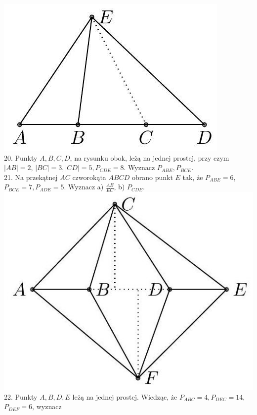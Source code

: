 \documentclass[10pt]{article}
\begin{document}
\includegraphics[max width=\textwidth, center]{2024_11_21_71f62bd117d375398909g-035}\\
20. Punkty \(A, B, C, D\), na rysunku obok, leżą na jednej prostej, przy czym \(|A B|=2\), \(|B C|=3,|C D|=5, P_{C D E}=8\). Wyznacz \(P_{A B E}, P_{B C E}\).\\
21. Na przekątnej \(A C\) czworokąta \(A B C D\) obrano punkt \(E\) tak, że \(P_{A B E}=6\), \(P_{B C E}=7, P_{A D E}=5\). Wyznacz a) \(\frac{A E}{E C}\), b) \(P_{C D E}\).\\
\includegraphics[max width=\textwidth, center]{2024_11_21_71f62bd117d375398909g-035(1)}\\
22. Punkty \(A, B, D, E\) leżą na jednej prostej. Wiedząc, że \(P_{A B C}=4, P_{D E C}=14\), \(P_{D E F}=6\), wyznacz\\
\end{document}
